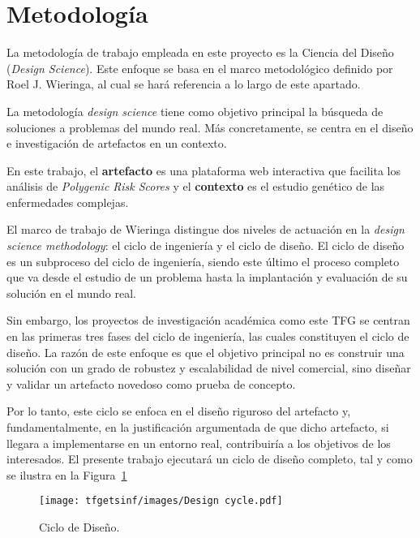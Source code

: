 \section{Metodología}
\label{section:metodologia}
La metodología de trabajo empleada en este proyecto es la Ciencia del Diseño (\textit{Design Science}). Este enfoque se basa en el marco metodológico definido por Roel J. Wieringa\cite{wieringa}, al cual se hará referencia a lo largo de este apartado.

La metodología \textit{design science} tiene como objetivo principal la búsqueda de soluciones a problemas del mundo real. Más concretamente, se centra en el diseño e investigación de artefactos en un contexto.

En este trabajo, el \textbf{artefacto} es una plataforma web interactiva que facilita los análisis de \textit{Polygenic Risk Scores} y el \textbf{contexto} es el estudio genético de las enfermedades complejas.

El marco de trabajo de Wieringa distingue dos niveles de actuación en la \textit{design science methodology}: el ciclo de ingeniería y el ciclo de diseño. El ciclo de diseño es un subproceso del ciclo de ingeniería, siendo este último el proceso completo que va desde el estudio de un problema hasta la implantación y evaluación de su solución en el mundo real.

Sin embargo, los proyectos de investigación académica como este TFG se centran en las primeras tres fases del ciclo de ingeniería, las cuales constituyen el ciclo de diseño. La razón de este enfoque es que el objetivo principal no es construir una solución con un grado de robustez y escalabilidad de nivel comercial, sino diseñar y validar un artefacto novedoso como prueba de concepto.

Por lo tanto, este ciclo se enfoca en el diseño riguroso del artefacto y, fundamentalmente, en la justificación argumentada de que dicho artefacto, si llegara a implementarse en un entorno real, contribuiría a los objetivos de los interesados. El presente trabajo ejecutará un ciclo de diseño completo, tal y como se ilustra en la Figura~\ref{fig:ciclo_diseno}

\begin{figure}[H]
\centering
    \texttt{[image: tfgetsinf/images/Design cycle.pdf]}
\caption{Ciclo de Diseño.}
\label{fig:ciclo_diseno}
\end{figure}

